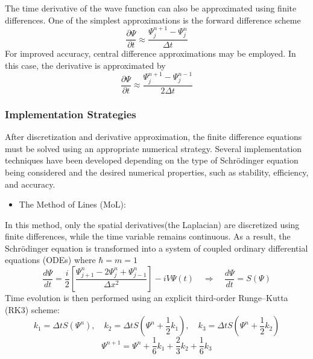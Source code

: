 \documentclass[11pt]{article}
\begin{document}
The time derivative of the wave function can also be approximated using finite differences. One of the simplest approximations is the forward difference scheme
\begin{equation}
	\frac{\partial \Psi }{\partial t} \approx \frac{\Psi_j^{n+1} - \Psi_j^n}{\Delta t}
\end{equation}
For improved accuracy, central difference approximations may be employed. In this case, the derivative is approximated by
\begin{equation}
	\frac{\partial \Psi }{\partial t} \approx \frac{\Psi_j^{n+1} - \Psi_j^{n-1}}{2 \Delta t}
\end{equation}

\subsubsection{Implementation Strategies}
After discretization and derivative approximation, the finite difference equations must be solved using an appropriate numerical strategy. Several implementation techniques have been developed depending on the type of Schrödinger equation being considered and the desired numerical properties, such as stability, efficiency, and accuracy.

\begin{itemize}
	\item 
	The Method of Lines (MoL):
\end{itemize}
In this method, only the spatial derivatives(the Laplacian) are discretized using finite differences, while the time variable remains continuous. As a result, the Schrödinger equation is transformed into a system of coupled ordinary differential equations (ODEs) where $\hbar = m = 1$
\begin{equation}
	 \frac{d \Psi}{dt} = \frac{i}{2} \left[ \frac{\Psi_{j+1}^n - 2 \Psi_j^n + \Psi_{j-1}^n}{\Delta x^2} \right] - i V \Psi(t) \quad \Rightarrow \quad
	 \frac{d \Psi}{dt} = S(\Psi)
\end{equation}
Time evolution is then performed using an explicit third-order Runge–Kutta (RK3) scheme:
\begin{equation}
	k_1 = \Delta t S(\Psi ^n), \quad 
	k_2 = \Delta t S(\Psi ^n + \frac{1}{2} k_1), \quad 
	k_3 = \Delta t S(\Psi ^n + \frac{1}{2} k_2)
\end{equation}
\begin{equation}
	\Psi^{n+1} = \Psi^n + \frac{1}{6} k_1 +  \frac{2}{3} k_2 + \frac{1}{6} k_3
\end{equation}
\end{document}
